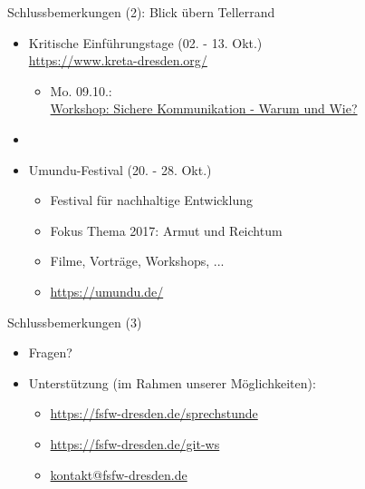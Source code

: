 \documentclass{beamer}
\begin{document}
\begin{frame}[label=schluss20]{Schlussbemerkungen (2): Blick übern Tellerrand}

\begin{itemize}
 \item Kritische Einführungstage (02. - 13. Okt.)\\[-6mm]
\url{https://www.kreta-dresden.org/}
\hspace{12mm}
   \begin{itemize}
   \item Mo. 09.10.:\\ \href{https://www.kreta-dresden.org/program/sichere-kommunikation-warum-und-wie.html}
   {Workshop: Sichere Kommunikation - Warum und Wie?}
   \end{itemize}
   \item[]
   \item Umundu-Festival (20. - 28. Okt.) \quad \hspace{12mm}
   \begin{itemize}
    \item Festival für nachhaltige Entwicklung
    \item Fokus Thema 2017: Armut und Reichtum
    \item Filme, Vorträge, Workshops, ...
    \item \url{https://umundu.de/}
   \end{itemize}
\end{itemize}

\end{frame}

\begin{frame}[label=uj]{Schlussbemerkungen (3)}
\begin{itemize}
 \item Fragen?\\[10mm]
 \item Unterstützung {\tiny (im Rahmen unserer Möglichkeiten)}:
   \begin{itemize}
   \item \url{https://fsfw-dresden.de/sprechstunde}
   \item \url{https://fsfw-dresden.de/git-ws}
   \item \url{kontakt@fsfw-dresden.de}
   \end{itemize}
\end{itemize}

\end{frame}
\end{document}
